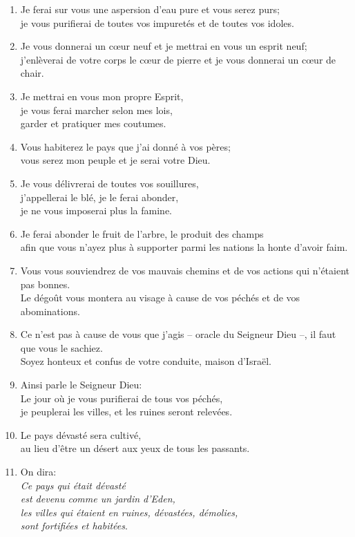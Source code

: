 \documentclass[12pt,a4paper,titlepage]{article}
\def \pslabelsep{0.2em} %
\def \psleftmargin{0em} %
\begin{document}
\begin{enumerate}[leftmargin=\psleftmargin, labelsep = \pslabelsep, label={\arabic*}, font=\color{\pscolor}\small\textsuperscript, parsep=0em, itemsep=0em, topsep=0em ]
\item Je ferai sur vous une aspersion d’eau pure et vous serez purs; \\ je vous purifierai de toutes vos impuretés et de toutes vos idoles.
\item Je vous donnerai un cœur neuf et je mettrai en vous un esprit neuf; \\ j’enlèverai de votre corps le cœur de pierre et je vous donnerai un cœur de chair.
\item Je mettrai en vous mon propre Esprit, \\ je vous ferai marcher selon mes lois, \\ garder et pratiquer mes coutumes.
\item Vous habiterez le pays que j’ai donné à vos pères; \\ vous serez mon peuple et je serai votre Dieu.
\item Je vous délivrerai de toutes vos souillures, \\ j’appellerai le blé, je le ferai abonder, \\ je ne vous imposerai plus la famine.
\item Je ferai abonder le fruit de l’arbre, le produit des champs \\ afin que vous n’ayez plus à supporter parmi les nations la honte d’avoir faim.
\item Vous vous souviendrez de vos mauvais chemins et de vos actions qui n’étaient pas bonnes. \\ Le dégoût vous montera au visage à cause de vos péchés et de vos abominations.
\item Ce n’est pas à cause de vous que j’agis – oracle du Seigneur Dieu –, il faut que vous le sachiez. \\ Soyez honteux et confus de votre conduite, maison d’Israël. \parSpace
\item Ainsi parle le Seigneur Dieu: \\ Le jour où je vous purifierai de tous vos péchés, \\ je peuplerai les villes, et les ruines seront relevées.
\item Le pays dévasté sera cultivé, \\ au lieu d’être un désert aux yeux de tous les passants.
\item On dira: \\ \decalage \og{}\emph{Ce pays qui était dévasté \\ \decalage est devenu comme un jardin d’Eden, \\\decalage les villes qui étaient en ruines, dévastées, démolies, \\ \decalage sont fortifiées et habitées}.\fg{}

\end{enumerate}
\end{document}
